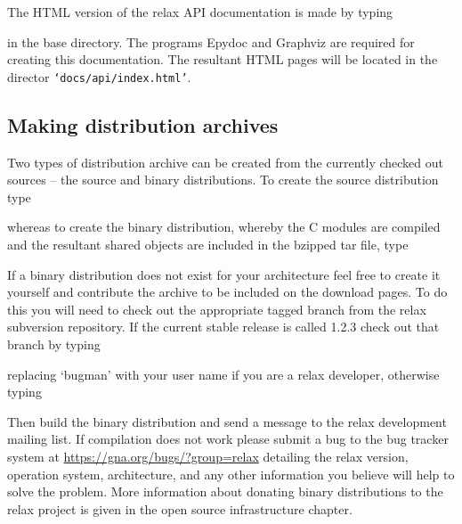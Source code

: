 The HTML version of the relax API documentation is made by typing


in the base directory.  The programs Epydoc and Graphviz are required for creating this documentation.  The resultant HTML pages will be located in the director \texttt{`docs/api/index.html'}.



\subsection{Making distribution archives}

Two types of distribution archive can be created from the currently checked out sources -- the source and binary distributions.  To create the source distribution type 


whereas to create the binary distribution, whereby the C modules are compiled and the resultant shared objects are included in the bzipped tar file, type


If a binary distribution does not exist for your architecture feel free to create it yourself and contribute the archive to be included on the download pages.  To do this you will need to check out the appropriate tagged branch from the relax subversion repository.  If the current stable release is called 1.2.3 check out that branch by typing


replacing `bugman' with your user name if you are a relax developer, otherwise typing


Then build the binary distribution and send a message to the relax development mailing list.  If compilation does not work please submit a bug to the bug tracker system at \href{https://gna.org/bugs/?group=relax}{https://gna.org/bugs/?group=relax} detailing the relax version, operation system, architecture, and any other information you believe will help to solve the problem.  More information about donating binary distributions to the relax project is given in the open source infrastructure chapter.



